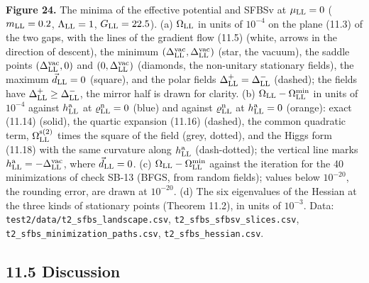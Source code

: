 \documentclass[
  10pt,
]{article}
\begin{document}
\textbf{Figure 24.} The minima of the effective potential and SFBSv at
\(\mu_{\rm LL}=0\) (\(m_{\rm LL}=0.2\), \(\Lambda_{\rm LL}=1\),
\(G_{\rm LL}=22.5\)). (a) \(\Omega_{\rm LL}\) in units of \(10^{-4}\) on
the plane (11.3) of the two gaps, with the lines of the gradient flow
(11.5) (white, arrows in the direction of descent), the minimum
\((\Delta^{\rm vac}_{\rm LL},\Delta^{\rm vac}_{\rm LL})\) (star, the
vacuum), the saddle points \((\Delta^{\rm vac}_{\rm LL},0)\) and
\((0,\Delta^{\rm vac}_{\rm LL})\) (diamonds, the non-unitary stationary
fields), the maximum \(\vec d_{\rm LL}=0\) (square), and the polar
fields \(\Delta^+_{\rm LL}=\Delta^-_{\rm LL}\) (dashed); the fields have
\(\Delta^+_{\rm LL}\ge\Delta^-_{\rm LL}\), the mirror half is drawn for
clarity. (b) \(\Omega_{\rm LL}-\Omega^{\rm min}_{\rm LL}\) in units of
\(10^{-4}\) against \(h^{\rm a}_{\rm LL}\) at
\(\varrho^{\rm n}_{\rm LL}=0\) (blue) and against
\(\varrho^{\rm n}_{\rm LL}\) at \(h^{\rm a}_{\rm LL}=0\) (orange): exact
(11.14) (solid), the quartic expansion (11.16) (dashed), the common
quadratic term, \(\Omega^{\rm s(2)}_{\rm LL}\) times the square of the
field (grey, dotted), and the Higgs form (11.18) with the same curvature
along \(h^{\rm a}_{\rm LL}\) (dash-dotted); the vertical line marks
\(h^{\rm a}_{\rm LL}=-\Delta^{\rm vac}_{\rm LL}\), where
\(\vec d_{\rm LL}=0\). (c) \(\Omega_{\rm LL}-\Omega^{\rm min}_{\rm LL}\)
against the iteration for the 40 minimizations of check SB-13 (BFGS,
from random fields); values below \(10^{-20}\), the rounding error, are
drawn at \(10^{-20}\). (d) The six eigenvalues of the Hessian at the
three kinds of stationary points (Theorem 11.2), in units of
\(10^{-3}\). Data: \texttt{test2/data/t2\_sfbs\_landscape.csv},
\texttt{t2\_sfbs\_sfbsv\_slices.csv},
\texttt{t2\_sfbs\_minimization\_paths.csv},
\texttt{t2\_sfbs\_hessian.csv}.

\hypertarget{discussion-9}{%
\subsection{11.5 Discussion}\label{discussion-9}}
\end{document}
